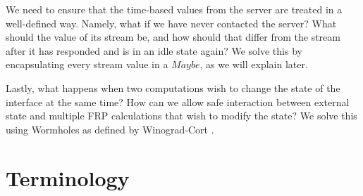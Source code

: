 \documentclass[twocolumn]{paper}
\begin{document}
We need to ensure that the time-based values from the server are treated in a well-defined way. Namely, what if we have never contacted the server? What should the value of its stream be, and how should that differ from the stream after it has responded and is in an idle state again? We solve this by encapsulating every stream value in a $Maybe$, as we will explain later. 

Lastly, what happens when two computations wish to change the state of the interface at the same time? How can we allow safe interaction between external state and multiple FRP calculations that wish to modify the state? We solve this using Wormholes as defined by Winograd-Cort \cite{WinogradCort2012HS}.

\section{Terminology}
\end{document}

